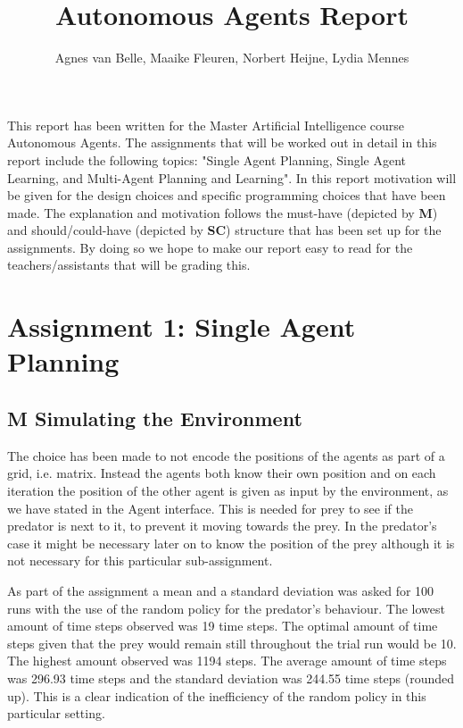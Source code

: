 \documentclass{article}
\begin{document}
\title{Autonomous Agents Report}
\author{Agnes van Belle, Maaike Fleuren, Norbert Heijne, Lydia Mennes}
\maketitle

This report has been written for the Master Artificial Intelligence course Autonomous Agents. The assignments that will be worked out in detail in this report include the following topics: "Single Agent Planning, Single Agent Learning, and Multi-Agent Planning and Learning". In this report motivation will be given for the design choices and specific programming choices that have been made. The explanation and motivation follows the must-have (depicted by \textbf{M}) and should/could-have (depicted by \textbf{SC}) structure that has been set up for the assignments. By doing so we hope to make our report easy to read for the teachers/assistants that will be grading this.

\section{Assignment 1: Single Agent Planning}

\subsection{\textbf{M} Simulating the Environment}
The choice has been made to not encode the positions of the agents as part of a grid, i.e. matrix. Instead the agents both know their own position and on each iteration the position of the other agent is given as input by the environment, as we have stated in the Agent interface. This is needed for prey to see if the predator is next to it, to prevent it moving towards the prey. In the predator's case it might be necessary later on to know the position of the prey although it is not necessary for this particular sub-assignment.

As part of the assignment a mean and a standard deviation was asked for 100 runs with the use of the random policy for the predator's behaviour. The lowest amount of time steps observed was 19 time steps. The optimal amount of time steps given that the prey would remain still throughout the trial run would be 10. The highest amount observed was 1194 steps. The average amount of time steps was 296.93 time steps and the standard deviation was 244.55 time steps (rounded up). This is a clear indication of the inefficiency of the random policy in this particular setting. 
\end{document}

